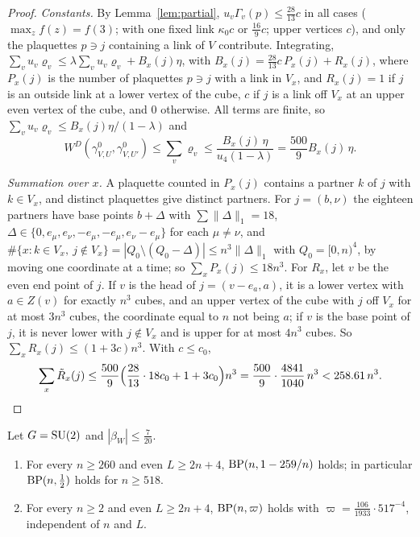 \begin{proof}
\emph{Constants.} By Lemma~\ref{lem:partial}, $u_v\Gamma_v(p)\le\frac{28}{13}c$
in all cases ($\max_zf(z)=f(3)$; with one fixed link $\kappa_0c$ or
$\frac{16}9c$; upper vertices $c$), and only the plaquettes $p\ni j$
containing a link of $V$ contribute. Integrating, $\sum_vu_v\varrho_v\le
\lambda\sum_vu_v\varrho_v+B_x(j)\eta$, with $B_x(j)=\frac{28}{13}c\,P_x(j)+
R_x(j)$, where $P_x(j)$ is the number of plaquettes $p\ni j$ with a link in
$V_x$, and $R_x(j)=1$ if $j$ is an outside link at a lower vertex of the
cube, $c$ if $j$ is a link off $V_x$ at an upper even vertex of the cube, and
$0$ otherwise. All terms are finite, so $\sum_vu_v\varrho_v\le
B_x(j)\eta/(1-\lambda)$ and
\[
W^D(\gamma^0_{V,U},\gamma^0_{V,U'})\le\sum_v\varrho_v\le\frac{B_x(j)\,\eta}
{u_4(1-\lambda)}=\frac{500}9B_x(j)\,\eta .
\]

\emph{Summation over $x$.} A plaquette counted in $P_x(j)$ contains a partner
$k$ of $j$ with $k\in V_x$, and distinct plaquettes give distinct partners.
For $j=(b,\nu)$ the eighteen partners have base points $b+\Delta$ with
$\sum\|\Delta\|_1=18$, $\Delta\in\{0,e_\mu,e_\nu,-e_\mu,-e_\mu,e_\nu-e_\mu\}$
for each $\mu\ne\nu$, and $\#\{x:k\in V_x,\ j\notin V_x\}=|Q_0\setminus(Q_0-
\Delta)|\le n^3\|\Delta\|_1$ with $Q_0=[0,n)^4$, by moving one coordinate at a
time; so $\sum_xP_x(j)\le18n^3$. For $R_x$, let $v$ be the even end point of
$j$. If $v$ is the head of $j=(v-e_a,a)$, it is a lower vertex with $a\in
Z(v)$ for exactly $n^3$ cubes, and an upper vertex of the cube with $j$ off
$V_x$ for at most $3n^3$ cubes, the coordinate equal to $n$ not being $a$; if
$v$ is the base point of $j$, it is never lower with $j\notin V_x$ and is upper
for at most $4n^3$ cubes. So $\sum_xR_x(j)\le(1+3c)n^3$. With $c\le c_0$,
\[
\sum_x\tilde R_x(j)\le\frac{500}9\Bigl(\frac{28}{13}\cdot18c_0+1+3c_0\Bigr)n^3
=\frac{500}9\cdot\frac{4841}{1040}\,n^3<258.61\,n^3 .\qedhere
\]
\end{proof}

\begin{theorem}\label{thm:starsuniform}
Let $G=\mathrm{SU}(2)$ and $|\beta_W|\le\frac7{20}$.
\begin{enumerate}[label=\textup{(\roman*)},leftmargin=*]
\item For every $n\ge260$ and even $L\ge2n+4$, $\mathrm{BP}(n,1-259/n)$ holds; in
particular $\mathrm{BP}(n,\frac12)$ holds for $n\ge518$.
\item For every $n\ge2$ and even $L\ge2n+4$, $\mathrm{BP}(n,\varpi)$ holds with
$\varpi=\frac{106}{1933}\cdot517^{-4}$, independent of $n$ and $L$.
\end{enumerate}
\end{theorem}

